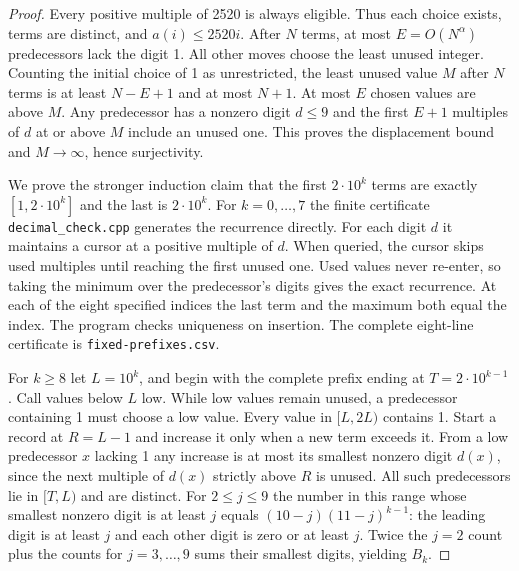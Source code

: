 \documentclass[11pt]{article}
\begin{document}
\begin{proof}
Every positive multiple of 2520 is always eligible. Thus each choice exists, terms are distinct, and $a(i)\le2520i$. After $N$ terms, at most $E=O(N^\alpha)$ predecessors lack the digit 1. All other moves choose the least unused integer. Counting the initial choice of 1 as unrestricted, the least unused value $M$ after $N$ terms is at least $N-E+1$ and at most $N+1$. At most $E$ chosen values are above $M$. Any predecessor has a nonzero digit $d\le9$ and the first $E+1$ multiples of $d$ at or above $M$ include an unused one. This proves the displacement bound and $M\to\infty$, hence surjectivity.

We prove the stronger induction claim that the first $2\cdot10^k$ terms are exactly $[1,2\cdot10^k]$ and the last is $2\cdot10^k$. For $k=0,\ldots,7$ the finite certificate \texttt{decimal\_check.cpp} generates the recurrence directly. For each digit $d$ it maintains a cursor at a positive multiple of $d$. When queried, the cursor skips used multiples until reaching the first unused one. Used values never re-enter, so taking the minimum over the predecessor's digits gives the exact recurrence. At each of the eight specified indices the last term and the maximum both equal the index. The program checks uniqueness on insertion. The complete eight-line certificate is \texttt{fixed-prefixes.csv}.

For $k\ge8$ let $L=10^k$, and begin with the complete prefix ending at $T=2\cdot10^{k-1}$. Call values below $L$ low. While low values remain unused, a predecessor containing 1 must choose a low value. Every value in $[L,2L)$ contains 1. Start a record at $R=L-1$ and increase it only when a new term exceeds it. From a low predecessor $x$ lacking 1 any increase is at most its smallest nonzero digit $d(x)$, since the next multiple of $d(x)$ strictly above $R$ is unused. All such predecessors lie in $[T,L)$ and are distinct. For $2\le j\le9$ the number in this range whose smallest nonzero digit is at least $j$ equals $(10-j)(11-j)^{k-1}$: the leading digit is at least $j$ and each other digit is zero or at least $j$. Twice the $j=2$ count plus the counts for $j=3,\ldots,9$ sums their smallest digits, yielding $B_k$.


\end{proof}
\end{document}
